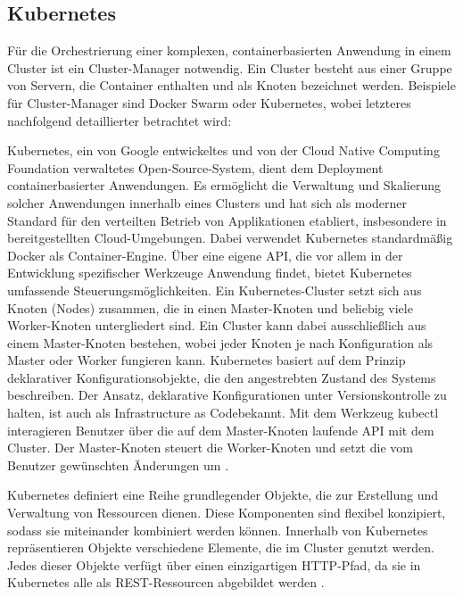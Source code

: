 {\subsection{Kubernetes}

Für die Orchestrierung einer komplexen, containerbasierten Anwendung in einem \glqq Cluster\grqq{} ist ein Cluster-Manager notwendig. Ein Cluster besteht aus einer Gruppe von Servern, die Container enthalten und als Knoten bezeichnet werden. Beispiele für Cluster-Manager sind Docker Swarm oder Kubernetes, wobei letzteres nachfolgend detaillierter betrachtet wird:

Kubernetes, ein von Google entwickeltes und von der Cloud Native Computing Foundation verwaltetes Open-Source-System, dient dem Deployment containerbasierter Anwendungen. Es ermöglicht die Verwaltung und Skalierung solcher Anwendungen innerhalb eines Clusters und hat sich als moderner Standard für den verteilten Betrieb von Applikationen etabliert, insbesondere in bereitgestellten Cloud-Umgebungen. Dabei verwendet Kubernetes standardmäßig Docker als Container-Engine. Über eine eigene API, die vor allem in der Entwicklung spezifischer Werkzeuge Anwendung findet, bietet Kubernetes umfassende Steuerungsmöglichkeiten. Ein Kubernetes-Cluster setzt sich aus Knoten (Nodes) zusammen, die in einen Master-Knoten und beliebig viele Worker-Knoten untergliedert sind. Ein Cluster kann dabei ausschließlich aus einem Master-Knoten bestehen, wobei jeder Knoten je nach Konfiguration als Master oder Worker fungieren kann. Kubernetes basiert auf dem Prinzip deklarativer Konfigurationsobjekte, die den angestrebten Zustand des Systems beschreiben. Der Ansatz, deklarative Konfigurationen unter Versionskontrolle zu halten, ist auch als \glqq Infrastructure as Code\grqq bekannt. Mit dem Werkzeug kubectl interagieren Benutzer über die auf dem Master-Knoten laufende API mit dem Cluster. Der Master-Knoten steuert die Worker-Knoten und setzt die vom Benutzer gewünschten Änderungen um \cite[S.1,4]{burns1} \cite{burns3} \cite[S.79,81]{riti} \cite[S. 60-63,166]{stender}.

Kubernetes definiert eine Reihe grundlegender Objekte, die zur Erstellung und Verwaltung von Ressourcen dienen. Diese Komponenten sind flexibel konzipiert, sodass sie miteinander kombiniert werden können. Innerhalb von Kubernetes repräsentieren Objekte verschiedene Elemente, die im Cluster genutzt werden. Jedes dieser Objekte verfügt über einen einzigartigen HTTP-Pfad, da sie in Kubernetes alle als REST-Ressourcen abgebildet werden \cite[S.40, 42]{burns1} \cite[S.80-81]{riti} \cite[S. 166-192]{stender}.

}

